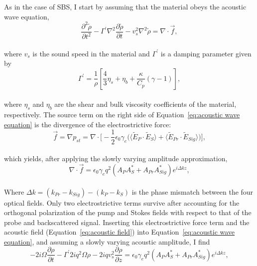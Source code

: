 As in the case of SBS\cite{boyd2020nonlinear}, I start by assuming that the material obeys the acoustic wave equation,
\\
\begin{equation}
    \frac{\partial^{2}\tilde{\rho}}{\partial t^{2}} - \Gamma^{\prime}\nabla^{2}\frac{\partial\tilde{\rho}}{\partial t} - v_{s}^{2}\nabla^{2}\tilde{\rho} = \nabla\cdot\vec{f},
    \label{eq:acoustic wave equation}
\end{equation}
\\
\noindent where \(v_{s}\) is the sound speed in the material and \(\Gamma^{\prime}\) is a damping parameter given by
\\
\begin{equation}
    \Gamma^{\prime} = \frac{1}{\rho}\left[\frac{4}{3}\eta_{s} + \eta_{b} + \frac{\kappa}{C_{p}}(\gamma - 1)\right],
\end{equation}
\\
\noindent where \(\eta_{s}\) and \(\eta_{b}\) are the shear and bulk viscosity coefficients of the material, respectively. The source term on the right side of Equation~\ref{eq:acoustic wave equation} is the divergence of the electrostrictive force:
\\
\begin{equation}
    \vec{f} = \nabla p_{st} = \nabla \cdot \Bigg[-\frac{1}{2}\epsilon_{0}\gamma_{e}\Big(\langle\tilde{E}_{P} \cdot \tilde{E}_{S}\rangle + \langle\tilde{E}_{Pr} \cdot \tilde{E}_{Sig}\rangle\Big)\Bigg],
\end{equation}
\\
which yields, after applying the slowly varying amplitude approximation,
\\
\begin{equation}
    \nabla\cdot\vec{f} = \epsilon_{0}\gamma_{e}q^{2}(A_{P}A_{S}^{*} + A_{Pr}A_{Sig}^{*})e^{i\Delta kz},
\end{equation}
\\
Where \(\Delta k = (k_{Pr} - k_{Sig}) - (k_{P} - k_{S})\) is the phase mismatch between the four optical fields. Only two electrostrictive terms survive after accounting for the orthogonal polarization of the pump and Stokes fields with respect to that of the probe and backscattered signal. Inserting this electrostrictive force term and the acoustic field (Equation~\ref{eq:acoustic field}) into Equation~\ref{eq:acoustic wave equation}, and assuming a slowly varying acoustic amplitude, I find
\\
\begin{equation}
    -2i\Omega\frac{\partial\rho}{\partial t} - \Gamma^{\prime}2iq^{2}\Omega\rho - 2iqv_{s}^{2}\frac{\partial\rho}{\partial z} = \epsilon_{0}\gamma_{e}q^{2}(A_{P}A_{S}^{*} + A_{Pr}A_{Sig}^{*})e^{i\Delta kz},
\end{equation}
